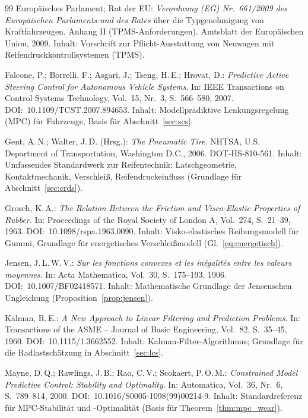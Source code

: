 ﻿\documentclass[12pt,a4paper]{article}
\theoremstyle{definition}
\theoremstyle{remark}
\begin{document}
\begin{thebibliography}{99}
Europäisches Parlament; Rat der EU:
\textit{Verordnung (EG) Nr.~661/2009 des Europäischen Parlaments und des Rates}
über die Typgenehmigung von Kraftfahrzeugen, Anhang II (TPMS-Anforderungen).
Amtsblatt der Europäischen Union, 2009.
Inhalt: Vorschrift zur Pflicht-Ausstattung von Neuwagen mit Reifendruckkontrollsystemen (TPMS).

Falcone, P.; Borrelli, F.; Asgari, J.; Tseng, H.\,E.; Hrovat, D.:
\textit{Predictive Active Steering Control for Autonomous Vehicle Systems}.
In: IEEE Transactions on Control Systems Technology, Vol.~15, Nr.~3,
S.~566--580, 2007. DOI:~10.1109/TCST.2007.894653.
Inhalt: Modellprädiktive Lenkungsregelung (MPC) für Fahrzeuge, Basis für
Abschnitt~\ref{sec:scs}.

Gent, A.\,N.; Walter, J.\,D. (Hrsg.): \textit{The Pneumatic Tire}.
NHTSA, U.S. Department of Transportation, Washington D.C., 2006.
DOT-HS-810-561.
Inhalt: Umfassendes Standardwerk zur Reifentechnik: Latschgeometrie, Kontaktmechanik,
Verschleiß, Reifendruckeinfluss (Grundlage für Abschnitt~\ref{sec:crds}).

Grosch, K.\,A.: \textit{The Relation Between the Friction and Visco-Elastic Properties
of Rubber}.
In: Proceedings of the Royal Society of London A, Vol.~274, S.~21--39, 1963.
DOI:~10.1098/rspa.1963.0090.
Inhalt: Visko-elastisches Reibungsmodell für Gummi, Grundlage für energetisches
Verschleißmodell (Gl.~\ref{eq:energetisch}).

Jensen, J.\,L.\,W.\,V.: \textit{Sur les fonctions convexes et les inégalités entre
les valeurs moyennes}.
In: Acta Mathematica, Vol.~30, S.~175--193, 1906.
DOI:~10.1007/BF02418571.
Inhalt: Mathematische Grundlage der Jensenschen Ungleichung (Proposition~\ref{prop:jensen}).

Kalman, R.\,E.: \textit{A New Approach to Linear Filtering and Prediction Problems}.
In: Transactions of the ASME -- Journal of Basic Engineering, Vol.~82, S.~35--45, 1960.
DOI:~10.1115/1.3662552.
Inhalt: Kalman-Filter-Algorithmus; Grundlage für die Radlastschätzung
in Abschnitt~\ref{sec:lcs}.

Mayne, D.\,Q.; Rawlings, J.\,B.; Rao, C.\,V.; Scokaert, P.\,O.\,M.:
\textit{Constrained Model Predictive Control: Stability and Optimality}.
In: Automatica, Vol.~36, Nr.~6, S.~789--814, 2000.
DOI:~10.1016/S0005-1098(99)00214-9.
Inhalt: Standardreferenz für MPC-Stabilität und -Optimalität
(Basis für Theorem~\ref{thm:mpc_wear}).


\end{thebibliography}
\end{document}
